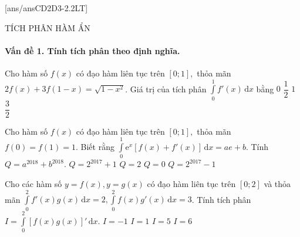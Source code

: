 [ans/ansCD2D3-2.2LT]
\begin{dang}{TÍCH PHÂN HÀM ẨN}
\end{dang}
\paragraph{Vấn đề 1. Tính tích phân theo định nghĩa.}
\begin{ex}%
	Cho hàm số $f(x)$ có đạo hàm liên tục trên $[0;1],$ thỏa mãn $2f(x)+3f(1-x)=\sqrt{1-x^2}$. Giá trị của tích phân $\displaystyle\int\limits_0^1 f'(x)\mathrm{\,d}x$ bằng
	\choice
	{$0$}
	{$\dfrac{1}{2}$}
	{\True $1$}
	{$\dfrac{3}{2}$}
\end{ex}
\begin{ex}%
	Cho hàm số $f(x)$ có đạo hàm liên tục trên $[0;1],$ thỏa mãn $f(0)=f(1)=1$. Biết rằng $\displaystyle\int\limits_0^1\mathrm{e}^x[f(x)+f'(x)]\mathrm{\,d}x=ae+b$. Tính $Q=a^{2018}+b^{2018}$. 
	\choice
	{$Q=2^{2017}+1$}
	{\True $Q=2$}
	{$Q=0$}
	{$Q=2^{2017}-1$}
\end{ex}
\begin{ex}%
	Cho các hàm số $y=f(x), y=g(x)$ có đạo hàm liên tục trên $[0;2]$ và thỏa mãn $\displaystyle\int\limits_0^2 f'(x)g(x)\mathrm{\,d}x=2,\displaystyle\int\limits_0^2 f(x)g'(x)\mathrm{\,d}x=3$. Tính tích phân $I=\displaystyle\int\limits_0^2[f(x)g(x)]'\mathrm{\,d}x$. 
	\choice
	{$I=-1$}
	{$I=1$}
	{\True $I=5$}
	{$I=6$}
\end{ex}
